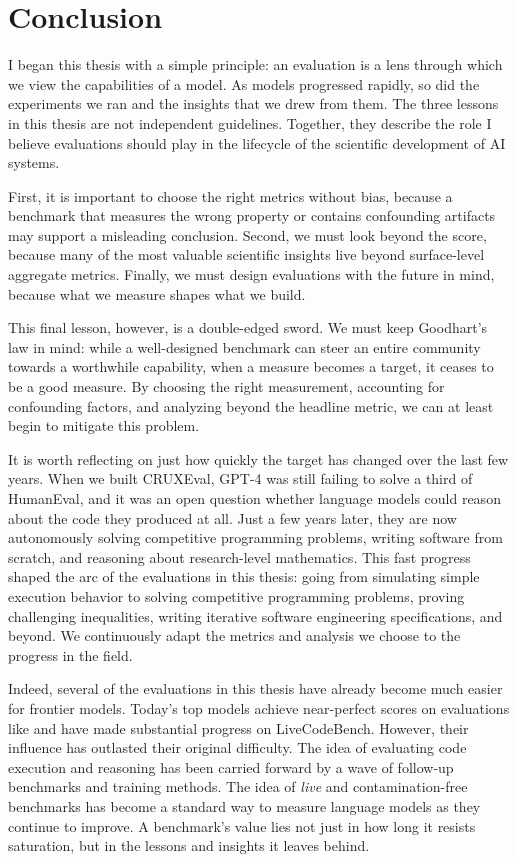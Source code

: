 \chapter{Conclusion}
\label{chap:conclusion}

I began this thesis with a simple principle: an evaluation is a lens through which we view the
capabilities of a model. As models progressed rapidly, so did the experiments we ran and the
insights that we drew from them. The three lessons in this thesis are not independent guidelines. 
Together, they describe the role I believe evaluations should play in the lifecycle of the 
scientific development of AI systems.

First, it is important to choose the right metrics
without bias, because a benchmark that measures the wrong property or contains confounding artifacts may
support a misleading conclusion. Second, we must look beyond the score, because many of the most valuable
scientific insights live beyond surface-level aggregate metrics. Finally, we must design evaluations with the
future in mind, because what we measure shapes what we build.

This final lesson, however, is a double-edged sword. We must keep Goodhart's law in mind:
while a well-designed benchmark can steer an entire community towards a worthwhile capability, when a
measure becomes a target, it ceases to be a good measure. By choosing the right measurement, accounting for
confounding factors, and analyzing beyond the headline metric, we can at least begin to mitigate this problem.

It is worth reflecting on just how quickly the target has changed over the last few years.
When we built CRUXEval, GPT-4 was still failing to solve a third of HumanEval, and it was an open question whether
language models could reason about the code they produced at all. Just a few years later, they are now autonomously solving
competitive programming problems, writing software from scratch, and reasoning about research-level mathematics.
This fast progress shaped the arc of the evaluations in this thesis: going from simulating simple execution behavior to solving
competitive programming problems, proving challenging inequalities, writing iterative software engineering specifications,
and beyond. We continuously adapt the metrics and analysis we choose to the progress in the field.

Indeed, several of the evaluations in this thesis have already become much easier for frontier models. Today's top
models achieve near-perfect scores on evaluations like \benchmark{} and have made substantial progress on
LiveCodeBench. However, their influence has outlasted their original difficulty.
The idea of evaluating code execution and reasoning has been carried forward by a wave of follow-up benchmarks and training methods.
The idea of \textit{live} and contamination-free benchmarks has become a standard way to measure language models as they continue to improve.
A benchmark's value lies not just in how long it resists saturation, but in the lessons and insights it leaves behind.

